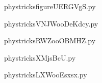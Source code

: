     

    \clearpage
    


    \newcommand{\CaptionFigfigureUERGVgS}{<+Type your caption here+>}
    \begin{center}
        
    \end{center}
    phystricksfigureUERGVgS.py

    

    \clearpage
    


    \newcommand{\CaptionFigVNJWooDeKdcy}{<+Type your caption here+>}
    \begin{center}
        
    \end{center}
    phystricksVNJWooDeKdcy.py

    

    \clearpage
    


    \newcommand{\CaptionFigRWZooOBMHZ}{<+Type your caption here+>}
    \begin{center}
        
    \end{center}
    phystricksRWZooOBMHZ.py

    

    \clearpage
    


    \newcommand{\CaptionFigXMjsBcU}{<+Type your caption here+>}
    \begin{center}
        
    \end{center}
    phystricksXMjsBcU.py

    

    \clearpage
    


    \newcommand{\CaptionFigLXWooEsxsx}{<+Type your caption here+>}
    \begin{center}
        
    \end{center}
    phystricksLXWooEsxsx.py

    

    \clearpage
    



